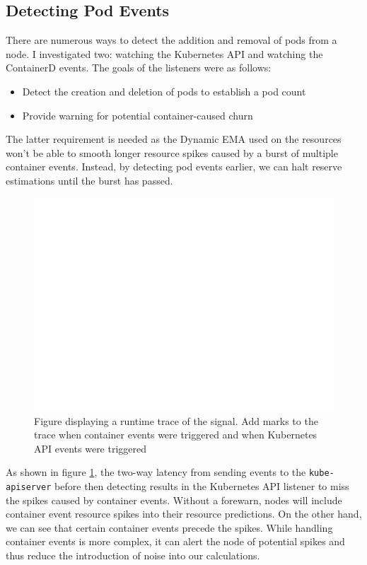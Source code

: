 \subsection{Detecting Pod Events}

There are numerous ways to detect the addition and removal of pods from a node.
I investigated two: watching the Kubernetes API and watching the ContainerD
events. The goals of the listeners were as follows:
\begin{itemize}
    \item Detect the creation and deletion of pods to establish a pod count
    \item Provide warning for potential container-caused churn
\end{itemize}
The latter requirement is needed as the Dynamic EMA used on the resources won't
be able to smooth longer resource spikes caused by a burst of multiple container
events. Instead, by detecting pod events earlier, we can halt reserve
estimations until the burst has passed.

\begin{figure}[h]
    \centering
    \includegraphics[width=\textwidth]{images/blank.pdf}
    \caption{Figure displaying a runtime trace of the signal. Add marks to the
    trace when container events were triggered and when Kubernetes API events
    were triggered}
    \label{eval-listner}
\end{figure}

As shown in figure \ref{eval-listner}, the two-way latency from sending events
to the \verb|kube-apiserver| before then detecting results in the Kubernetes API
listener to miss the spikes caused by container events. Without a forewarn, nodes
will include container event resource spikes into their resource predictions. On
the other hand, we can see that certain container events precede the spikes.
While handling container events is more complex, it can alert the node of
potential spikes and thus reduce the introduction of noise into our
calculations.

